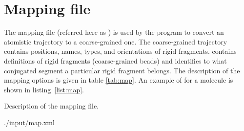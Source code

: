 \section{Mapping file}
\label{sec:xmlmap}

The mapping file (referred here as \xmlcsg) is used by the program \ctpmap to convert an atomistic trajectory to a coarse-grained one. The coarse-grained trajectory contains positions, names, types, and orientations of rigid fragments. \xmlcsg contains definitions of rigid fragments (coarse-grained beads) and identifies to what conjugated segment a particular rigid fragment belongs. The description of the mapping options is given in table \ref{tab:map}. An example of \xmlcsg for a \dcvt molecule is shown in listing~\ref{list:map}. 

\begin{table}[ht]
\caption{Description of the \xml mapping file.}
\label{tab:map}
 {\small }
\end{table}

\vfill

%
{./input/map.xml}

\vfill